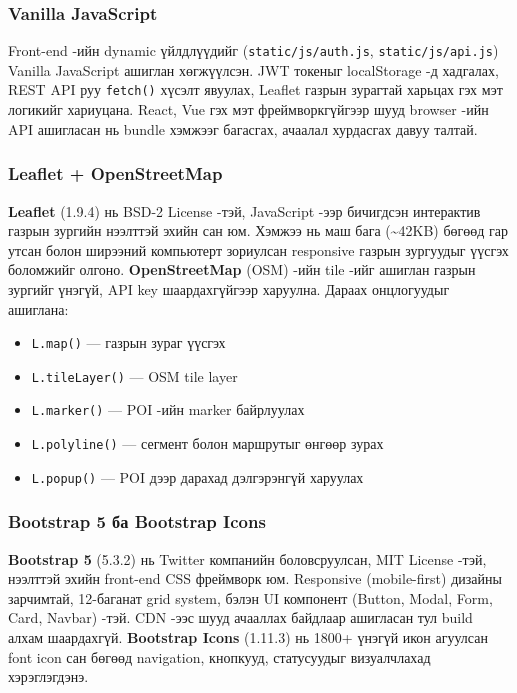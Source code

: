 \subsubsection{Vanilla JavaScript}
Front-end -ийн dynamic үйлдлүүдийг (\texttt{static/js/auth.js}, \texttt{static/js/api.js}) Vanilla JavaScript ашиглан хөгжүүлсэн. JWT токеныг localStorage -д хадгалах, REST API руу \texttt{fetch()} хүсэлт явуулах, Leaflet газрын зурагтай харьцах гэх мэт логикийг хариуцана. React, Vue гэх мэт фреймворкгүйгээр шууд browser -ийн API ашигласан нь bundle хэмжээг багасгах, ачаалал хурдасгах давуу талтай.

\subsubsection{Leaflet + OpenStreetMap}
\textbf{Leaflet} (1.9.4) нь BSD-2 License -тэй, JavaScript -ээр бичигдсэн интерактив газрын зургийн нээлттэй эхийн сан юм. Хэмжээ нь маш бага (\textasciitilde 42KB) бөгөөд гар утсан болон ширээний компьютерт зориулсан responsive газрын зургуудыг үүсгэх боломжийг олгоно. \textbf{OpenStreetMap} (OSM) -ийн tile -ийг ашиглан газрын зургийг үнэгүй, API key шаардахгүйгээр харуулна. Дараах онцлогуудыг ашиглана:
\begin{itemize}
    \item \texttt{L.map()} — газрын зураг үүсгэх
    \item \texttt{L.tileLayer()} — OSM tile layer
    \item \texttt{L.marker()} — POI -ийн marker байрлуулах
    \item \texttt{L.polyline()} — сегмент болон маршрутыг өнгөөр зурах
    \item \texttt{L.popup()} — POI дээр дарахад дэлгэрэнгүй харуулах
\end{itemize}

\subsubsection{Bootstrap 5 ба Bootstrap Icons}
\textbf{Bootstrap 5} (5.3.2) нь Twitter компанийн боловсруулсан, MIT License -тэй, нээлттэй эхийн front-end CSS фреймворк юм. Responsive (mobile-first) дизайны зарчимтай, 12-баганат grid system, бэлэн UI компонент (Button, Modal, Form, Card, Navbar) -тэй. CDN -ээс шууд ачааллах байдлаар ашигласан тул build алхам шаардахгүй. \textbf{Bootstrap Icons} (1.11.3) нь 1800+ үнэгүй икон агуулсан font icon сан бөгөөд navigation, кнопкууд, статусуудыг визуалчлахад хэрэглэгдэнэ.

